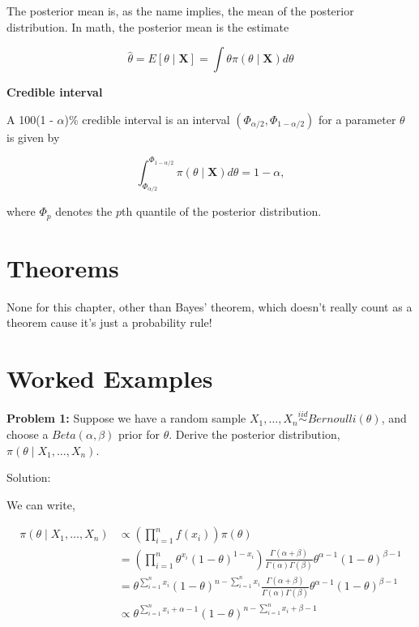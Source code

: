 \documentclass[
  letterpaper,
  DIV=11,
  numbers=noendperiod]{scrreprt}
\begin{document}
The posterior mean is, as the name implies, the mean of the posterior
distribution. In math, the posterior mean is the estimate

\[
\hat{\theta} = E[\theta \mid \textbf{X}] = \int \theta \pi(\theta \mid \textbf{X}) d\theta
\]

\textbf{Credible interval}

A 100(1 - \(\alpha\))\% credible interval is an interval
\((\Phi_{\alpha/2}, \Phi_{1 - \alpha/2})\) for a parameter \(\theta\) is
given by

\[
\int_{\Phi_{\alpha/2}}^{\Phi_{1 - \alpha/2}} \pi(\theta \mid \textbf{X}) d\theta = 1 - \alpha, 
\]

where \(\Phi_p\) denotes the \(p\)th quantile of the posterior
distribution.

\section{Theorems}\label{theorems-7}

None for this chapter, other than Bayes' theorem, which doesn't really
count as a theorem cause it's just a probability rule!

\section{Worked Examples}\label{worked-examples-7}

\textbf{Problem 1:} Suppose we have a random sample
\(X_1, \dots, X_n \overset{iid}{\sim} Bernoulli(\theta)\), and choose a
\(Beta(\alpha, \beta)\) prior for \(\theta\). Derive the posterior
distribution, \(\pi(\theta \mid X_1, \dots, X_n)\).

Solution:

We can write,

\begin{align*}
    \pi(\theta \mid X_1, \dots, X_n) & \propto \left( \prod_{i = 1}^n f(x_i) \right) \pi(\theta) \\
    & = \left( \prod_{i = 1}^n \theta^{x_i} (1 - \theta)^{1 - x_i} \right) \frac{\Gamma(\alpha + \beta)}{\Gamma(\alpha)\Gamma(\beta)} \theta^{\alpha - 1} (1 - \theta)^{\beta - 1} \\
    & = \theta^{\sum_{i = 1}^n x_i} (1 - \theta)^{n - \sum_{i = 1}^n x_i}  \frac{\Gamma(\alpha + \beta)}{\Gamma(\alpha)\Gamma(\beta)} \theta^{\alpha - 1} (1 - \theta)^{\beta - 1} \\
    & \propto \theta^{\sum_{i = 1}^n x_i + \alpha - 1} (1 - \theta)^{n - \sum_{i = 1}^n x_i + \beta - 1}
\end{align*}
\end{document}
